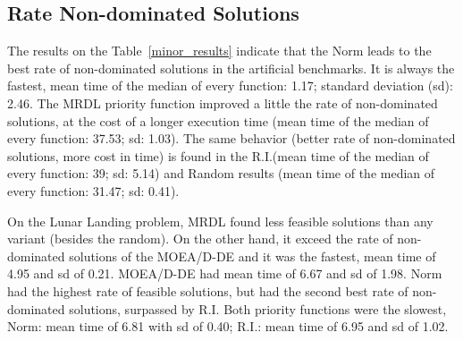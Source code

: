\subsection{Rate Non-dominated Solutions}

The results on the Table~\ref{minor_results} indicate that the Norm leads to the best rate of non-dominated solutions in the artificial benchmarks. It is always the fastest, mean time of the median of every function: 1.17; standard deviation (sd): 2.46. The MRDL priority function improved a little the rate of non-dominated solutions, at the cost of a longer execution time (mean time of the median of every function: 37.53; sd: 1.03). The same behavior (better rate of non-dominated solutions, more cost in time) is found in the R.I.(mean time of the median of every function: 39; sd: 5.14) and Random results (mean time of the median of every function: 31.47; sd: 0.41). 

On the Lunar Landing problem, MRDL found less feasible solutions than any variant (besides the random). On the other hand, it exceed the rate of non-dominated solutions of the MOEA/D-DE and it was the fastest, mean time of 4.95 and sd of 0.21. MOEA/D-DE had mean time of 6.67 and sd of 1.98. Norm had the highest rate of feasible solutions, but had the second best rate of non-dominated solutions, surpassed by R.I. Both priority functions were the slowest, Norm: mean time of 6.81 with sd of 0.40; R.I.: mean time of 6.95 and sd of 1.02. 











